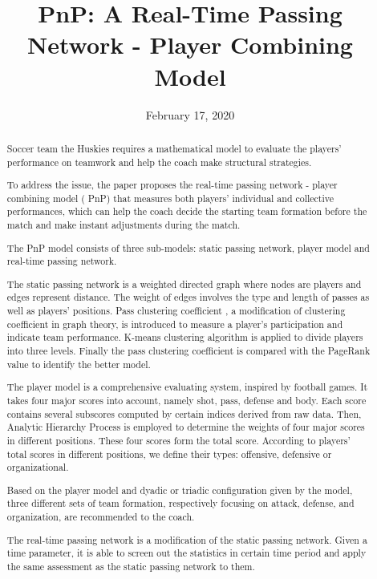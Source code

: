 \documentclass{mcmthesis}
\begin{document}
\linespread{0.6} %
\setlength{\parskip}{0.5\baselineskip} %
\title{PnP: A Real-Time Passing Network - Player Combining Model}

\date{February 17, 2020}\begin{abstract}

    Soccer team the Huskies requires a mathematical model to evaluate the players' performance on teamwork and help the coach make structural strategies.

    To address the issue, the paper proposes the real-time passing network - player combining model ( PnP) that measures both players' individual and collective performances, which can help the coach decide the starting team formation before the match and make instant adjustments during the match.

    The PnP model consists of three sub-models: static passing network, player model and real-time passing network.

    The static passing network is a weighted directed graph where nodes are players and edges represent distance. The weight of edges involves the type and length of passes as well as players' positions. Pass clustering coefficient , a modification of clustering coefficient in graph theory, is introduced to measure a player's participation and indicate team performance. K-means clustering algorithm is applied to divide players into three levels. Finally the pass clustering coefficient is compared with the PageRank value to identify the better model.

    The player model is a comprehensive evaluating system, inspired by football games. It takes four major scores into account, namely shot, pass, defense and body. Each score contains several subscores computed by certain indices derived from raw data. Then, Analytic Hierarchy Process is employed to determine the weights of four major scores in different positions. These four scores form the total score. According to players' total scores in different positions, we define their types: offensive, defensive or organizational.

    Based on the player model and dyadic or triadic configuration given by the model, three different sets of team formation, respectively focusing on attack, defense, and organization, are recommended to the coach.

    The real-time passing network is a modification of the static passing network. Given a time parameter, it is able to screen out the statistics in certain time period and apply the same assessment as the static passing network to them.


\end{abstract}
\end{document}
